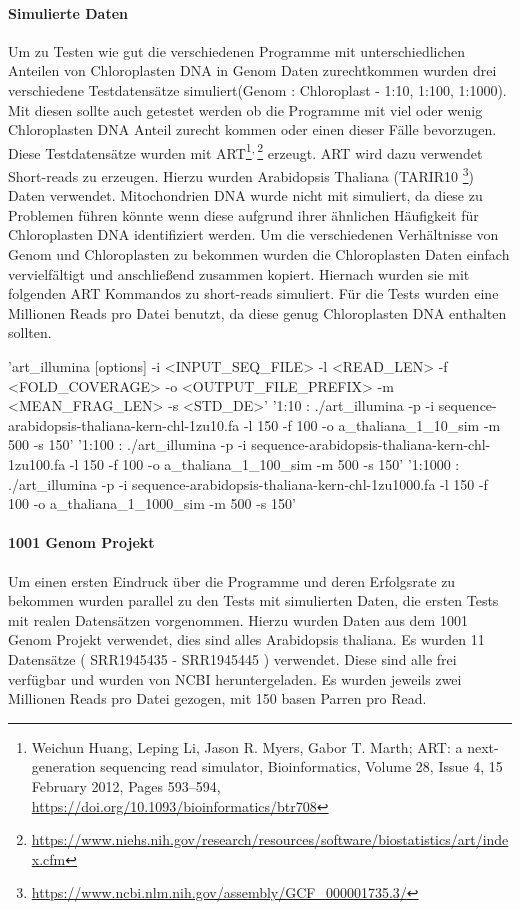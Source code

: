 \documentclass{scrartcl}
\begin{document}
\paragraph{Simulierte Daten}
\label{sec-3-1-1-1}
Um zu Testen wie gut die verschiedenen Programme mit unterschiedlichen Anteilen von Chloroplasten DNA in
Genom Daten zurechtkommen wurden drei verschiedene Testdatensätze simuliert(Genom : Chloroplast - 1:10, 1:100, 1:1000). 
Mit diesen sollte auch getestet werden ob die Programme mit viel oder wenig Chloroplasten DNA Anteil zurecht kommen oder einen dieser Fälle 
bevorzugen. Diese Testdatensätze wurden mit ART\footnote{Weichun Huang, Leping Li, Jason R. Myers, Gabor T. Marth; ART: a next-generation sequencing read simulator, Bioinformatics, Volume 28, Issue 4, 15 February 2012, Pages 593–594, \url{https://doi.org/10.1093/bioinformatics/btr708}}\textsuperscript{,}\,\footnote{\url{https://www.niehs.nih.gov/research/resources/software/biostatistics/art/index.cfm}} erzeugt. ART wird dazu verwendet Short-reads zu erzeugen. 
Hierzu wurden Arabidopsis Thaliana (TARIR10 \footnote{\url{https://www.ncbi.nlm.nih.gov/assembly/GCF_000001735.3/}}) Daten verwendet. Mitochondrien DNA wurde nicht mit simuliert, da diese zu 
Problemen führen könnte wenn diese aufgrund ihrer ähnlichen Häufigkeit für Chloroplasten DNA identifiziert werden. 
Um die verschiedenen Verhältnisse von Genom und Chloroplasten zu bekommen wurden die Chloroplasten Daten einfach
vervielfältigt und anschließend zusammen kopiert. Hiernach wurden sie mit folgenden ART Kommandos zu short-reads simuliert.
Für die Tests wurden eine Millionen Reads pro Datei benutzt, da diese genug Chloroplasten DNA enthalten sollten.

'art\_illumina [options] -i <INPUT\_SEQ\_FILE> -l <READ\_LEN> -f <FOLD\_COVERAGE> -o <OUTPUT\_FILE\_PREFIX> -m <MEAN\_FRAG\_LEN> -s <STD\_DE>'
'1:10 : ./art\_illumina -p -i sequence-arabidopsis-thaliana-kern-chl-1zu10.fa -l 150 -f 100 -o a\_thaliana\_1\_10\_sim -m 500 -s 150'
'1:100 :  ./art\_illumina -p -i sequence-arabidopsis-thaliana-kern-chl-1zu100.fa -l 150 -f 100 -o a\_thaliana\_1\_100\_sim -m 500 -s 150'
'1:1000 :  ./art\_illumina -p -i sequence-arabidopsis-thaliana-kern-chl-1zu1000.fa -l 150 -f 100 -o a\_thaliana\_1\_1000\_sim -m 500 -s 150'

\paragraph{1001 Genom Projekt}
\label{sec-3-1-1-2}
Um einen ersten Eindruck über die Programme und deren Erfolgsrate zu bekommen wurden parallel zu den Tests mit simulierten Daten, die ersten Tests mit realen Datensätzen vorgenommen. 
Hierzu wurden Daten aus dem 1001 Genom Projekt\footnotemark[32]{} verwendet, dies sind alles Arabidopsis thaliana. Es wurden 11 Datensätze ( SRR1945435 - SRR1945445 ) verwendet. Diese sind alle
frei verfügbar und wurden von NCBI heruntergeladen. Es wurden jeweils zwei Millionen Reads pro Datei gezogen, mit 150 basen Parren pro Read.
\end{document}
